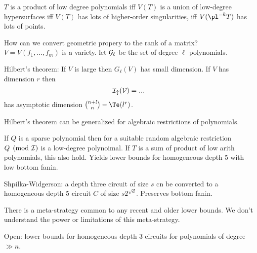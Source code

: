 $T$ is a product of low degree polynomials iff $V(T)$ is a union of low-degree hypersurfaces iff $V(T)$ has lots of higher-order singularities, iff $V(\pl^{=k}T)$ has lots of points.

How can we convert geometric propery to the rank of a matrix? $V=V(f_1,\ldots, f_m)$ is a variety. let $\cal G_{\ell}$ be the set of degree $\ell$ polynomials.

Hilbert's theorem: If $V$ is large then $G_{\ell}(V)$ has small dimension. If $V$ has dimension $r$ then 
\[
\cal I_l(V)=...
\]
has asymptotic dimension $\binom{n+l}{n}-\Te(l^r)$.

Hilbert's theorem can be generalized for algebraic restrictions of polynomials.


If $Q$ is a sparse polynomial then for a suitable random  algebraic restriction $Q\pmod{\cal I}$ is a low-degree polynoimal. If $T$ is a sum of product of low arith polynomials, this also hold. Yields lower bounds for homogeneous depth 5 with low bottom fanin.

Shpilka-Widgerson: a depth three circuit of size $s$ cn be converted to a homogeneous depth 5 circuit $C$ of size $s2^{\sqrt d}$. Preserves bottom fanin.

There is a meta-strategy common to any recent and older lower bounds. We don't understand the power or limitations of this meta-strategy.

Open: lower bounds for homogeneous depth 3 circuits for polynomials of degree $\gg n$.

